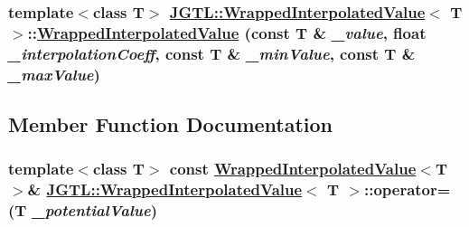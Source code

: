 \hypertarget{class_j_g_t_l_1_1_wrapped_interpolated_value_a5c969b821b5c9b1bd4342688264c82c}{
\subsubsection[WrappedInterpolatedValue]{\setlength{\rightskip}{0pt plus 5cm}template$<$class T$>$ \hyperlink{class_j_g_t_l_1_1_wrapped_interpolated_value}{JGTL::Wrapped\-Interpolated\-Value}$<$ T $>$::\hyperlink{class_j_g_t_l_1_1_wrapped_interpolated_value}{Wrapped\-Interpolated\-Value} (const T \& {\em \_\-value}, float {\em \_\-interpolation\-Coeff}, const T \& {\em \_\-min\-Value}, const T \& {\em \_\-max\-Value})}}
\label{class_j_g_t_l_1_1_wrapped_interpolated_value_a5c969b821b5c9b1bd4342688264c82c}




\subsection{Member Function Documentation}
\hypertarget{class_j_g_t_l_1_1_wrapped_interpolated_value_0608de450007ab26e20cd9a680da7e84}{
\subsubsection[operator=]{\setlength{\rightskip}{0pt plus 5cm}template$<$class T$>$ const \hyperlink{class_j_g_t_l_1_1_wrapped_interpolated_value}{Wrapped\-Interpolated\-Value}$<$T$>$\& \hyperlink{class_j_g_t_l_1_1_wrapped_interpolated_value}{JGTL::Wrapped\-Interpolated\-Value}$<$ T $>$::operator= (T {\em \_\-potential\-Value})}}
\label{class_j_g_t_l_1_1_wrapped_interpolated_value_0608de450007ab26e20cd9a680da7e84}




